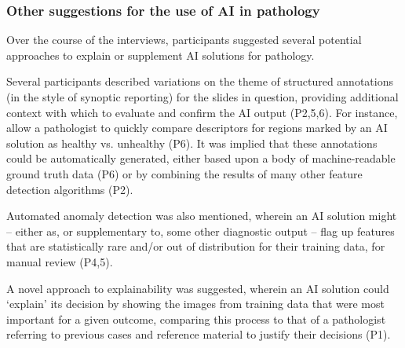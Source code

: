 \subsubsection{Other suggestions for the use of AI in pathology}
\label{sec:otherideas}

Over the course of the interviews, participants suggested several potential approaches to explain or supplement AI solutions for pathology.

Several participants described variations on the theme of structured annotations (in the style of synoptic reporting) for the slides in question, providing additional context with which to evaluate and confirm the AI output (P2,5,6). For instance, allow a pathologist to quickly compare descriptors for regions marked by an AI solution as healthy vs. unhealthy (P6). It was implied that these annotations could be automatically generated, either based upon a body of machine-readable ground truth data (P6) or by combining the results of many other feature detection algorithms (P2). 


Automated anomaly detection was also mentioned, wherein an AI solution might -- either as, or supplementary to, some other diagnostic output -- flag up features that are statistically rare and/or out of distribution for their training data, for manual review (P4,5).


A novel approach to explainability was suggested, wherein an AI solution could `explain' its decision by showing the images from training data that were most important for a given outcome, comparing this process to that of a pathologist referring to previous cases and reference material to justify their decisions (P1).

